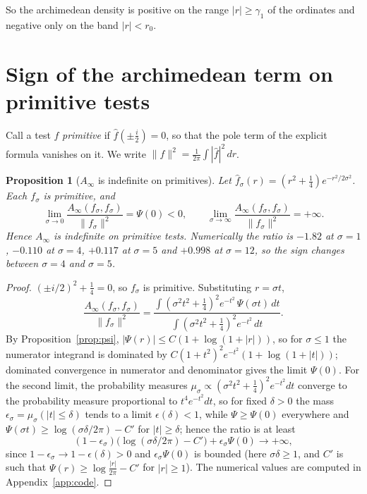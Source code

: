 \documentclass[11pt]{amsart}
\newtheorem{proposition}[theorem]{Proposition}
\theoremstyle{definition}
\theoremstyle{remark}
\newcommand{\Ainf}{A_\infty}
\begin{document}
So the archimedean density is positive on the range $|r|\ge\gamma_1$ of the
ordinates and negative only on the band $|r|<r_0$.

\section{Sign of the archimedean term on primitive tests}\label{sec:indef}
Call a test $f$ \emph{primitive} if $\widehat f(\pm\tfrac i2)=0$, so that the
pole term of the explicit formula vanishes on it. We write
$\|f\|^2=\frac1{2\pi}\int|\widehat f|^2\,dr$.

\begin{proposition}[$\Ainf$ is indefinite on primitives]\label{prop:indef}
Let $\widehat f_\sigma(r)=(r^2+\tfrac14)e^{-r^2/2\sigma^2}$. Each $f_\sigma$ is
primitive, and
\[
\lim_{\sigma\to0}\frac{\Ainf(f_\sigma,f_\sigma)}{\|f_\sigma\|^2}=\Psi(0)<0,
\qquad
\lim_{\sigma\to\infty}\frac{\Ainf(f_\sigma,f_\sigma)}{\|f_\sigma\|^2}=+\infty .
\]
Hence $\Ainf$ is indefinite on primitive tests. Numerically the ratio is
$-1.82$ at $\sigma=1$, $-0.110$ at $\sigma=4$, $+0.117$ at $\sigma=5$ and
$+0.998$ at $\sigma=12$, so the sign changes between $\sigma=4$ and $\sigma=5$.
\end{proposition}

\begin{proof}
$(\pm i/2)^2+\tfrac14=0$, so $f_\sigma$ is primitive. Substituting $r=\sigma t$,
\[
\frac{\Ainf(f_\sigma,f_\sigma)}{\|f_\sigma\|^2}
=\frac{\int(\sigma^2t^2+\frac14)^2e^{-t^2}\,\Psi(\sigma t)\,dt}
{\int(\sigma^2t^2+\frac14)^2e^{-t^2}\,dt}.
\]
By Proposition~\ref{prop:psi}, $|\Psi(r)|\le C(1+\log(1+|r|))$, so for
$\sigma\le1$ the numerator integrand is dominated by
$C(1+t^2)^2e^{-t^2}(1+\log(1+|t|))$; dominated convergence in numerator and denominator gives the limit $\Psi(0)$. For the second
limit, the probability measures
$\mu_\sigma\propto(\sigma^2t^2+\frac14)^2e^{-t^2}dt$ converge to the probability measure proportional to $t^4e^{-t^2}dt$, so for
fixed $\delta>0$ the mass $\epsilon_\sigma=\mu_\sigma(|t|\le\delta)$ tends to a
limit $\epsilon(\delta)<1$, while $\Psi\ge\Psi(0)$ everywhere and
$\Psi(\sigma t)\ge\log(\sigma\delta/2\pi)-C'$ for $|t|\ge\delta$; hence the
ratio is at least
\[(1-\epsilon_\sigma)\bigl(\log(\sigma\delta/2\pi)-C'\bigr)
+\epsilon_\sigma\Psi(0)\to+\infty,\]
since $1-\epsilon_\sigma\to1-\epsilon(\delta)>0$ and $\epsilon_\sigma\Psi(0)$ is
bounded (here $\sigma\delta\ge1$, and
$C'$ is such that $\Psi(r)\ge\log\frac{|r|}{2\pi}-C'$ for $|r|\ge1$). The numerical values are computed in
Appendix~\ref{app:code}.
\end{proof}
\end{document}

